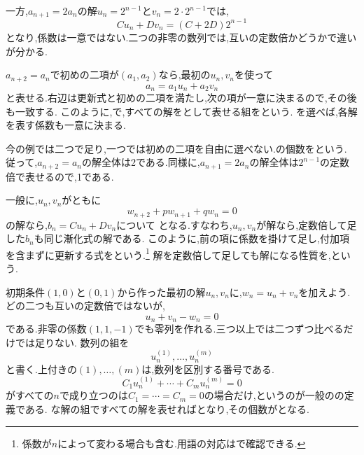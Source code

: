     一方,$a_{n+1}=2a_n$の解$u_n=2^{n-1}$と$v_n=2\cdot2^{n-1}$では,
    \[
      Cu_n+Dv_n=(C+2D)2^{n-1}
    \]
    となり,係数は一意ではない.二つの非零の数列では,互いの定数倍かどうかで違いが分かる.

    $a_{n+2}=a_n$で初めの二項が$(a_1,a_2)$なら,最初の$u_n,v_n$を使って
    \[
      a_n=a_1u_n+a_2v_n
    \]
    と表せる.右辺は更新式と初めの二項を満たし,次の項が一意に決まるので,その後も一致する.
    このように,で,すべての解をとして表せる組を\textbf{}という.
    を選べば,各解を表す係数も一意に決まる.

    今の例では二つで足り,一つでは初めの二項を自由に選べない.の個数を\textbf{}という.
    従って,$a_{n+2}=a_n$の解全体は2である.同様に,$a_{n+1}=2a_n$の解全体は$2^{n-1}$の定数倍で表せるので,1である.

    一般に,$u_n,v_n$がともに
    \[
      w_{n+2}+pw_{n+1}+qw_n=0
    \]
    の解なら,$b_n=Cu_n+Dv_n$について
    \BookMathLayout{\[
      \begin{aligned}
        b_{n+2}+pb_{n+1}+qb_n
        &=C(u_{n+2}+pu_{n+1}+qu_n)\\
        &\quad+D(v_{n+2}+pv_{n+1}+qv_n)\\
        &=0
      \end{aligned}
    \]}{\[
      \begin{aligned}
        b_{n+2}+pb_{n+1}+qb_n\\
        {}=C(u_{n+2}+pu_{n+1}+qu_n)\\
        \quad+D(v_{n+2}+pv_{n+1}+qv_n)\\
        {}=0
      \end{aligned}
    \]}
    となる.すなわち,$u_n,v_n$が解なら,定数倍して足した$b_n$も同じ漸化式の解である.
    このように,前の項に係数を掛けて足し,付加項を含まずに更新する式をという.\footnote{係数が$n$によって変わる場合も含む.用語の対応はで確認できる.}
    解を定数倍して足しても解になる性質を,\textbf{}という.

    初期条件$(1,0)$と$(0,1)$から作った最初の解$u_n,v_n$に,$w_n=u_n+v_n$を加えよう.
    どの二つも互いの定数倍ではないが,
    \[
      u_n+v_n-w_n=0
    \]
    である.非零の係数$(1,1,-1)$でも零列を作れる.三つ以上では二つずつ比べるだけでは足りない.
    数列の組を
    \[
      u^{(1)}_n,\ldots,u^{(m)}_n
    \]
    と書く.上付きの$(1),\ldots,(m)$は,数列を区別する番号である.
    \[
      C_1u^{(1)}_n+\cdots+C_mu^{(m)}_n=0
    \]
    がすべての$n$で成り立つのは$C_1=\cdots=C_m=0$の場合だけ,というのが一般のの定義である.
    \mbox{}な解の組ですべての解を表せればとなり,その個数がとなる.

